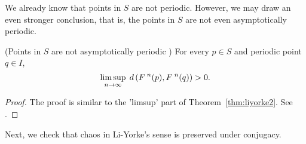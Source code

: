 \documentclass[10pt,draft,twoside]{book}
\begin{document}
We already know that points in $S$ are not periodic.
However, we may draw an even stronger conclusion, that is, the points in $S$ are not even asymptotically periodic.
\begin{theorem}
  (Points in $S$ are not asymptotically periodic \citep{li-yorke})
  For every $p \in S$ and periodic point $q \in I$,
  \begin{equation*}
    \limsup\limits_{n \to \infty}\; d\left( F^{\;n}(p) , F^{\;n}(q) \right) > 0.
  \end{equation*}
  \label{thm:liyorke3}
  \begin{proof}
    The proof is similar to the 'limsup' part of Theorem~\ref{thm:liyorke2}.
    See \citet{li-yorke}.
  \end{proof}
\end{theorem}
Next, we check that chaos in Li-Yorke's sense is preserved under conjugacy.
\end{document}
